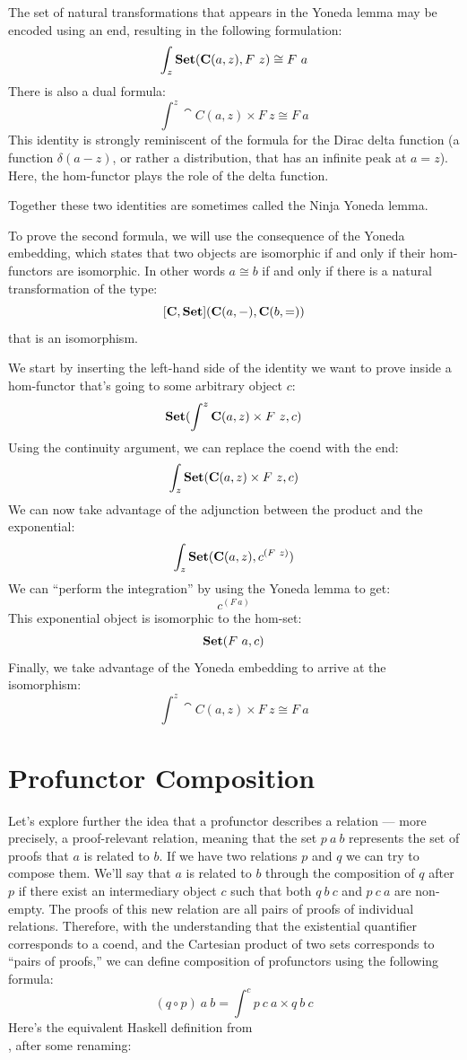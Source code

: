 The set of natural transformations that appears in the Yoneda lemma may
be encoded using an end, resulting in the following formulation:
\[\int_z \Set(\cat{C}(a, z), F\ z) \cong F\ a\]
There is also a dual formula:
\[\int^z \cat{C}(a, z)\times{}F\ z \cong F\ a\]
This identity is strongly reminiscent of the formula for the Dirac delta
function (a function $\delta(a - z)$, or rather a distribution, that
has an infinite peak at $a = z$). Here, the hom-functor plays
the role of the delta function.

Together these two identities are sometimes called the Ninja Yoneda
lemma.

To prove the second formula, we will use the consequence of the Yoneda
embedding, which states that two objects are isomorphic if and only if
their hom-functors are isomorphic. In other words $a \cong b$ if
and only if there is a natural transformation of the type:
\[[\mathbf{C}, \mathbf{Set}](\mathbf{C}(a, -), \mathbf{C}(b, =))\]
that is an isomorphism.

We start by inserting the left-hand side of the identity we want to
prove inside a hom-functor that's going to some arbitrary object
$c$:
\[\mathbf{Set}(\int^z \mathbf{C}(a, z)\times{}F\ z, c)\]
Using the continuity argument, we can replace the coend with the end:
\[\int_z \mathbf{Set}(\mathbf{C}(a, z)\times{}F\ z, c)\]
We can now take advantage of the adjunction between the product and the
exponential:
\[\int_z \mathbf{Set}(\mathbf{C}(a, z), c^{(F\ z)})\]
We can ``perform the integration'' by using the Yoneda lemma to get:
\[c^{(F\ a)}\]
This exponential object is isomorphic to the hom-set:
\[\mathbf{Set}(F\ a, c)\]
Finally, we take advantage of the Yoneda embedding to arrive at the
isomorphism:
\[\int^z \cat{C}(a, z)\times{}F\ z \cong F\ a\]

\section{Profunctor Composition}

Let's explore further the idea that a profunctor describes a relation
--- more precisely, a proof-relevant relation, meaning that the set
$p\ a\ b$ represents the set of proofs that $a$ is related
to $b$. If we have two relations $p$ and $q$ we can
try to compose them. We'll say that $a$ is related to $b$
through the composition of $q$ after $p$ if there exist an
intermediary object $c$ such that both $q\ b\ c$ and
$p\ c\ a$ are non-empty. The proofs of this new relation are all
pairs of proofs of individual relations. Therefore, with the
understanding that the existential quantifier corresponds to a coend,
and the Cartesian product of two sets corresponds to ``pairs of
proofs,'' we can define composition of profunctors using the following
formula:
\[(q \circ p)\ a\ b = \int^c p\ c\ a\times{}q\ b\ c\]
Here's the equivalent Haskell definition from\\
, after some renaming:

